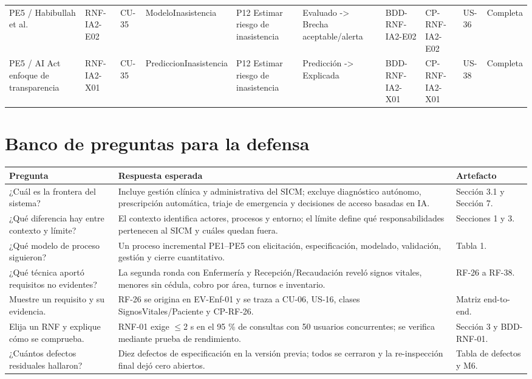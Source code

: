 \documentclass[11pt,a4paper]{article}
\begin{document}
\begin{appendices}
\begin{landscape}
\begin{longtable}{p{2.2cm}p{1.8cm}p{2cm}p{3cm}p{3cm}p{3cm}p{2cm}p{2cm}p{2cm}p{1.6cm}}
				PE5 / Habibullah et al. & RNF-IA2-E02 & CU-35 & ModeloInasistencia & P12 Estimar riesgo de inasistencia & Evaluado -> Brecha aceptable/alerta & BDD-RNF-IA2-E02 & CP-RNF-IA2-E02 & US-36 & Completa\\
				PE5 / AI Act enfoque de transparencia & RNF-IA2-X01 & CU-35 & PrediccionInasistencia & P12 Estimar riesgo de inasistencia & Predicción -> Explicada & BDD-RNF-IA2-X01 & CP-RNF-IA2-X01 & US-38 & Completa\\
				\bottomrule\end{longtable}\end{landscape}
		
		\section{Banco de preguntas para la defensa}
		\begin{longtable}{p{4.6cm}p{7.5cm}p{3cm}}\toprule\textbf{Pregunta}&\textbf{Respuesta esperada}&\textbf{Artefacto}\\\midrule\endhead
			¿Cuál es la frontera del sistema? & Incluye gestión clínica y administrativa del SICM; excluye diagnóstico autónomo, prescripción automática, triaje de emergencia y decisiones de acceso basadas en IA. & Sección 3.1 y Sección 7. \\
			¿Qué diferencia hay entre contexto y límite? & El contexto identifica actores, procesos y entorno; el límite define qué responsabilidades pertenecen al SICM y cuáles quedan fuera. & Secciones 1 y 3. \\
			¿Qué modelo de proceso siguieron? & Un proceso incremental PE1--PE5 con elicitación, especificación, modelado, validación, gestión y cierre cuantitativo. & Tabla 1. \\
			¿Qué técnica aportó requisitos no evidentes? & La segunda ronda con Enfermería y Recepción/Recaudación reveló signos vitales, menores sin cédula, cobro por área, turnos e inventario. & RF-26 a RF-38. \\
			Muestre un requisito y su evidencia. & RF-26 se origina en EV-Enf-01 y se traza a CU-06, US-16, clases SignosVitales/Paciente y CP-RF-26. & Matriz end-to-end. \\
			Elija un RNF y explique cómo se comprueba. & RNF-01 exige $\leq$2 s en el 95 \% de consultas con 50 usuarios concurrentes; se verifica mediante prueba de rendimiento. & Sección 3 y BDD-RNF-01. \\
			¿Cuántos defectos residuales hallaron? & Diez defectos de especificación en la versión previa; todos se cerraron y la re-inspección final dejó cero abiertos. & Tabla de defectos y M6. \\

\end{longtable}
\end{appendices}
\end{document}
